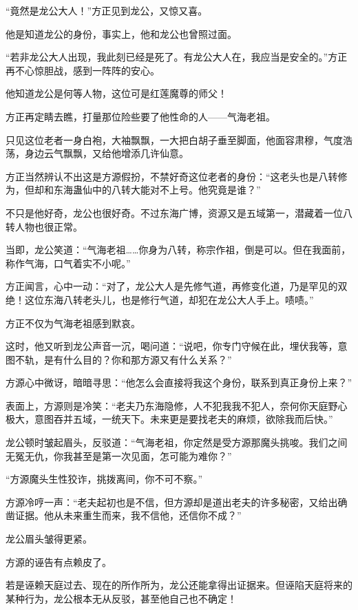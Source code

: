 
\begin{this_body}

“竟然是龙公大人！”方正见到龙公，又惊又喜。

他是知道龙公的身份，事实上，他和龙公也曾照过面。

“若非龙公大人出现，我此刻已经是死了。有龙公大人在，我应当是安全的。”方正再不心惊胆战，感到一阵阵的安心。

他知道龙公是何等人物，这位可是红莲魔尊的师父！

方正再定睛去瞧，打量那位险些要了他性命的人——气海老祖。

只见这位老者一身白袍，大袖飘飘，一大把白胡子垂至脚面，他面容肃穆，气度浩荡，身边云气飘飘，又给他增添几许仙意。

方正当然辨认不出这是方源假扮，不禁好奇这位老者的身份：“这老头也是八转修为，但却和东海蛊仙中的八转大能对不上号。他究竟是谁？”

不只是他好奇，龙公也很好奇。不过东海广博，资源又是五域第一，潜藏着一位八转人物也很正常。

当即，龙公笑道：“气海老祖……你身为八转，称宗作祖，倒是可以。但在我面前，称作气海，口气着实不小呢。”

方正闻言，心中一动：“对了，龙公大人是先修气道，再修变化道，乃是罕见的双绝！这位东海八转老头儿，也是修行气道，却犯在龙公大人手上。啧啧。”

方正不仅为气海老祖感到默哀。

这时，他又听到龙公声音一沉，喝问道：“说吧，你专门守候在此，埋伏我等，意图不轨，是有什么目的？你和那方源又有什么关系？”

方源心中微讶，暗暗寻思：“他怎么会直接将我这个身份，联系到真正身份上来？”

表面上，方源则是冷笑：“老夫乃东海隐修，人不犯我我不犯人，奈何你天庭野心极大，意图吞并五域，一统天下。未来更是要找老夫的麻烦，欲除我而后快。”

龙公顿时皱起眉头，反驳道：“气海老祖，你定然是受方源那魔头挑唆。我们之间无冤无仇，你我甚至是第一次见面，怎可能为难你？”

“方源魔头生性狡诈，挑拨离间，你不可不察。”

方源冷哼一声：“老夫起初也是不信，但方源却是道出老夫的许多秘密，又给出确凿证据。他从未来重生而来，我不信他，还信你不成？”

龙公眉头皱得更紧。

方源的诬告有点赖皮了。

若是诬赖天庭过去、现在的所作所为，龙公还能拿得出证据来。但诬陷天庭将来的某种行为，龙公根本无从反驳，甚至他自己也不确定！


\end{this_body}
